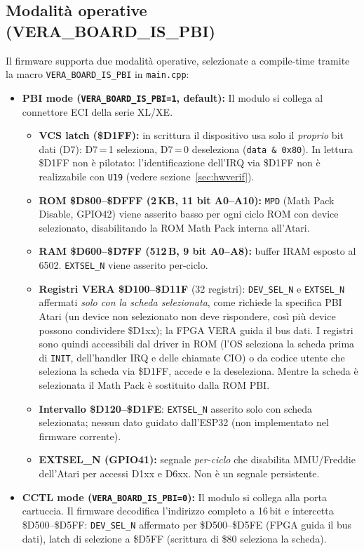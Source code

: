 \documentclass[12pt, a4paper]{article}
\begin{document}
\subsection{Modalità operative (VERA\_BOARD\_IS\_PBI)}
Il firmware supporta due modalità operative, selezionate a compile-time tramite la macro \texttt{VERA\_BOARD\_IS\_PBI} in \texttt{main.cpp}:

\begin{itemize}
    \item \textbf{PBI mode (\texttt{VERA\_BOARD\_IS\_PBI=1}, default):} Il modulo si collega al connettore ECI della serie XL/XE.
    \begin{itemize}
        \item \textbf{VCS latch (\$D1FF):} in scrittura il dispositivo usa solo il \emph{proprio} bit dati (D7): D7\,=\,1 seleziona, D7\,=\,0 deseleziona (\texttt{data \& 0x80}). In lettura \$D1FF non è pilotato: l'identificazione dell'IRQ via \$D1FF non è realizzabile con \texttt{U19} (vedere sezione~\ref{sec:hwverif}).
        \item \textbf{ROM \$D800--\$DFFF (2\,KB, 11 bit A0--A10):} \texttt{MPD} (Math Pack Disable, GPIO42) viene asserito basso per ogni ciclo ROM con device selezionato, disabilitando la ROM Math Pack interna all'Atari.
        \item \textbf{RAM \$D600--\$D7FF (512\,B, 9 bit A0--A8):} buffer IRAM esposto al 6502. \texttt{EXTSEL\_N} viene asserito per-ciclo.
        \item \textbf{Registri VERA \$D100--\$D11F} (32 registri): \texttt{DEV\_SEL\_N} e \texttt{EXTSEL\_N} affermati \emph{solo con la scheda selezionata}, come richiede la specifica PBI Atari (un device non selezionato non deve rispondere, così più device possono condividere \$D1xx); la FPGA VERA guida il bus dati. I registri sono quindi accessibili dal driver in ROM (l'OS seleziona la scheda prima di \texttt{INIT}, dell'handler IRQ e delle chiamate CIO) o da codice utente che seleziona la scheda via \$D1FF, accede e la deseleziona. Mentre la scheda è selezionata il Math Pack è sostituito dalla ROM PBI.
        \item \textbf{Intervallo \$D120--\$D1FE}: \texttt{EXTSEL\_N} asserito solo con scheda selezionata; nessun dato guidato dall'ESP32 (non implementato nel firmware corrente).
        \item \textbf{EXTSEL\_N (GPIO41):} segnale \emph{per-ciclo} che disabilita MMU/Freddie dell'Atari per accessi D1xx e D6xx. Non è un segnale persistente.
    \end{itemize}
    \item \textbf{CCTL mode (\texttt{VERA\_BOARD\_IS\_PBI=0}):} Il modulo si collega alla porta cartuccia. Il firmware decodifica l'indirizzo completo a 16\,bit e intercetta \$D500--\$D5FF: \texttt{DEV\_SEL\_N} affermato per \$D500--\$D5FE (FPGA guida il bus dati), latch di selezione a \$D5FF (scrittura di \$80 seleziona la scheda).
\end{itemize}
\end{document}
